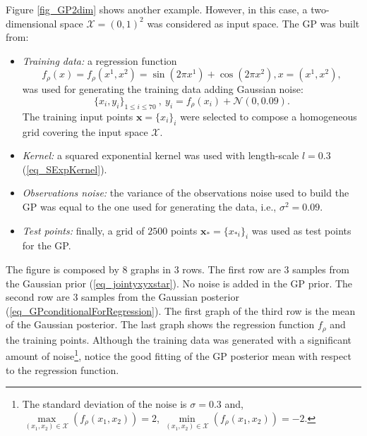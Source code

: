 Figure \ref{fig_GP2dim} shows another example. However, in this case, a two-dimensional space $\mathcal{X} = (0,1)^2$ was considered as input space. The GP was built from:
\begin{itemize}
  \item \emph{Training data:} a regression function 
    \begin{equation} \label{eq_GP2dimRegFunc}
      f_{\rho}(x) = f_{\rho}(x^1,x^2) = \sin(2 \pi x^1) + \cos(2 \pi x^2), x = (x^1,x^2),
    \end{equation} 
    was used for generating the training data adding Gaussian noise: 
    \begin{equation} \label{eq_GP2dimTrainData}
      \{x_i,y_i\}_{1 \leq i \leq 70} \ , \ y_i = f_{\rho}(x_i) + \mathcal{N}(0,0.09).
    \end{equation} 
    The training input points $\pmb{x} = \{x_i\}_i$ were selected to compose a homogeneous grid covering the input space $\mathcal{X}$.
  \item \emph{Kernel:} a squared exponential kernel was used with length-scale $l=0.3$ (\ref{eq_SExpKernel}).
  \item \emph{Observations noise:} the variance of the observations noise used to build the GP was equal to the one used for generating the data, i.e., $\sigma^2 = 0.09$.
  \item \emph{Test points:} finally, a grid of $2500$ points $\pmb{x_*} = \{x_{*i}\}_i$ was used as test points for the GP.
\end{itemize}
The figure is composed by $8$ graphs in $3$ rows. The first row are $3$ samples from the Gaussian prior (\ref{eq_jointyxyxstar}). No noise is added in the GP prior. The second row are $3$ samples from the Gaussian posterior (\ref{eq_GPconditionalForRegression}). The first graph of the third row is the mean of the Gaussian posterior. The last graph shows the regression function $f_{\rho}$ and the training points. Although the training data was generated with a significant amount of noise\footnote{
The standard deviation of the noise is $\sigma = 0.3$ and, \\
$\underset{(x_1,x_2) \in \mathcal{X}}{\max}(f_{\rho}(x_1,x_2)) = 2$, 
$\underset{(x_1,x_2) \in \mathcal{X}}{\min}(f_{\rho}(x_1,x_2)) = -2$. 
}, 
notice the good fitting of the GP posterior mean with respect to the regression function.

